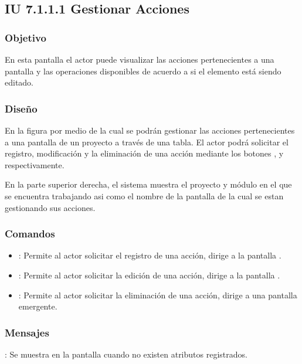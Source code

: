 \subsection{IU 7.1.1.1 Gestionar Acciones}

\subsubsection{Objetivo}
	En esta pantalla el actor puede visualizar las acciones pertenecientes a una pantalla y las operaciones disponibles de acuerdo a si el elemento está siendo editado.
\subsubsection{Diseño}
	En la figura  por medio de la cual se podrán gestionar las acciones pertenecientes a una pantalla de un proyecto a través de una tabla. El actor podrá solicitar el registro, modificación y la eliminación de una acción mediante los botones , \editar y \eliminar respectivamente.
	
	En la parte superior derecha, el sistema muestra el proyecto  y módulo en el que se encuentra trabajando asi como el nombre de la pantalla de la cual se estan gestionando sus acciones.

\subsubsection{Comandos}
\begin{itemize}
	\item {}: Permite al actor solicitar el registro de una acción, dirige a la pantalla .
	\item \editar [Modificar]: Permite al actor solicitar la edición de una acción, dirige a la pantalla .
	\item \eliminar [Eliminar]: Permite al actor solicitar la eliminación de una acción, dirige a una pantalla emergente.
\end{itemize}
\subsubsection{Mensajes}

\begin{Citemize}
	\item {}: Se muestra en la pantalla  cuando no existen atributos registrados.
\end{Citemize}

